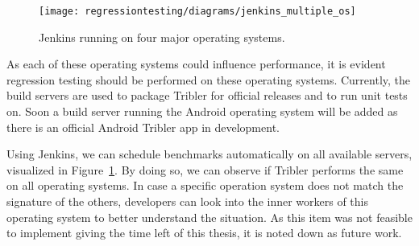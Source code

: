 \begin{figure}[!h]
	\centering
	\texttt{[image: regressiontesting/diagrams/jenkins\_multiple\_os]}
	\caption{Jenkins running on four major operating systems.}
	\label{fig:jenkins_multiple_os}
\end{figure} 

As each of these operating systems could influence performance, it is evident regression testing should be performed on these operating systems.
Currently, the build servers are used to package Tribler for official releases and to run unit tests on.
Soon a build server running the Android operating system will be added as there is an official Android Tribler app in development.

Using Jenkins, we can schedule benchmarks automatically on all available servers, visualized in Figure~\ref{fig:jenkins_multiple_os}.
By doing so, we can observe if Tribler performs the same on all operating systems.
In case a specific operation system does not match the signature of the others, developers can look into the inner workers of this operating system to better understand the situation.
As this item was not feasible to implement giving the time left of this thesis, it is noted down as future work.